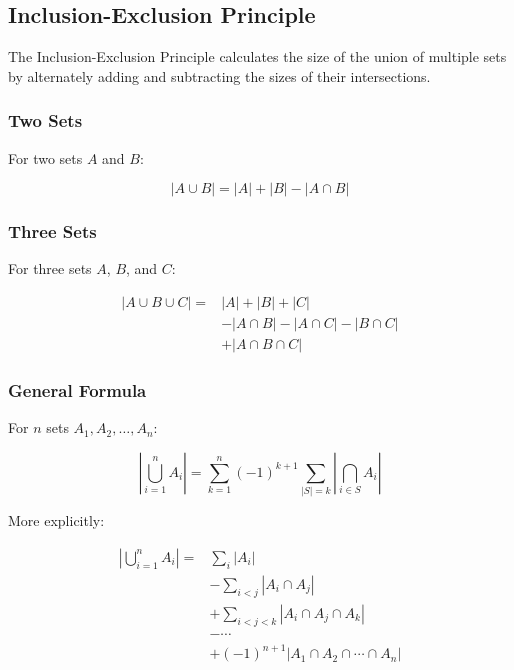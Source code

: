 \subsection{Inclusion-Exclusion Principle}

The Inclusion-Exclusion Principle calculates the size of the union of multiple sets by alternately adding and subtracting the sizes of their intersections.

\subsubsection{Two Sets}

For two sets $A$ and $B$:

\begin{equation}
    |A \cup B| = |A| + |B| - |A \cap B|
\end{equation}

\subsubsection{Three Sets}

For three sets $A$, $B$, and $C$:

\begin{align}
    |A \cup B \cup C| = &|A| + |B| + |C| \\
    &- |A \cap B| - |A \cap C| - |B \cap C| \\
    &+ |A \cap B \cap C|
\end{align}

\subsubsection{General Formula}

For $n$ sets $A_1, A_2, \ldots, A_n$:

\begin{equation}
    \left|\bigcup_{i=1}^n A_i\right| = \sum_{k=1}^{n} (-1)^{k+1} \sum_{|S|=k} \left|\bigcap_{i \in S} A_i\right|
\end{equation}

More explicitly:

\begin{align}
    \left|\bigcup_{i=1}^n A_i\right| = &\sum_{i} |A_i| \\
    &- \sum_{i < j} |A_i \cap A_j| \\
    &+ \sum_{i < j < k} |A_i \cap A_j \cap A_k| \\
    &- \cdots \\
    &+ (-1)^{n+1} |A_1 \cap A_2 \cap \cdots \cap A_n|
\end{align}

